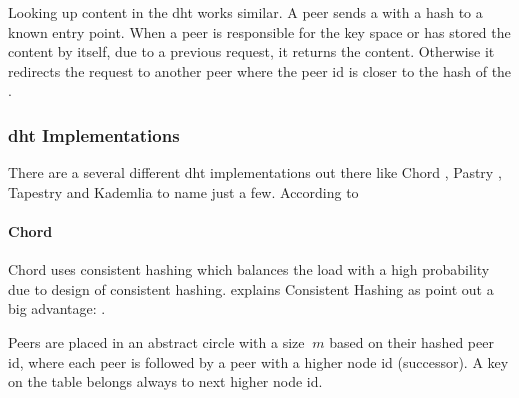 Looking up content in the \gls{dht} works similar. A peer sends a  with a hash to a known entry point. When a peer is responsible for the key space or has stored the content by itself, due to a previous request, it returns the content. Otherwise it redirects the request to another peer where the peer id is closer to the hash of the .

\subsubsection{\gls{dht} Implementations}
There are a several different \gls{dht} implementations out there like Chord \cite{chord}, Pastry \cite{pastry}, Tapestry \cite{tapestry} and Kademlia \cite{kademlia} to name just a few.
According to \citet[\S7.5]{tanenbaum_wetherall_2011} 

\paragraph{Chord}
Chord uses consistent hashing which balances the load with a high probability due to design of consistent hashing. \citet{consistentHashing} explains Consistent Hashing as  \citet[\S4.2]{chord} point out a big advantage: .

Peers are placed in an abstract circle with a size $\ m $ based on their hashed peer id, where each peer is followed by a peer with a higher node id (successor). A key on the table belongs always to next higher node id.

